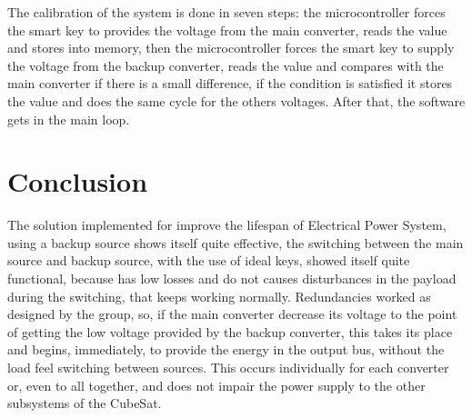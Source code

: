 \documentclass[3p]{elsarticle}
\begin{document}
	The calibration of the system is done in seven steps: the microcontroller forces the smart key to provides the voltage from the main converter, reads the value and stores into memory, then the microcontroller forces the smart key to supply the voltage from the backup converter, reads the value and compares with the main converter if there is a small difference, if the condition is satisfied it stores the value and does the same cycle for the others voltages. After that, the software gets in the main loop.

\section{Conclusion}
\label{Conclusion}

	 The solution implemented for improve the lifespan of Electrical Power System, using a backup source shows itself quite effective, the switching between the main source and backup source, with the use of ideal keys, showed itself quite functional, because has low losses and do not causes disturbances in the payload during the switching, that keeps working normally. Redundancies worked as designed by the group, so, if the main converter decrease its voltage to the point of getting the low voltage provided by the backup converter, this takes its place and begins, immediately, to provide the energy in the output bus, without the load feel switching between sources. This occurs individually for each converter or, even to all together, and does not impair the power supply to the other subsystems of the CubeSat.

	
\end{document}
